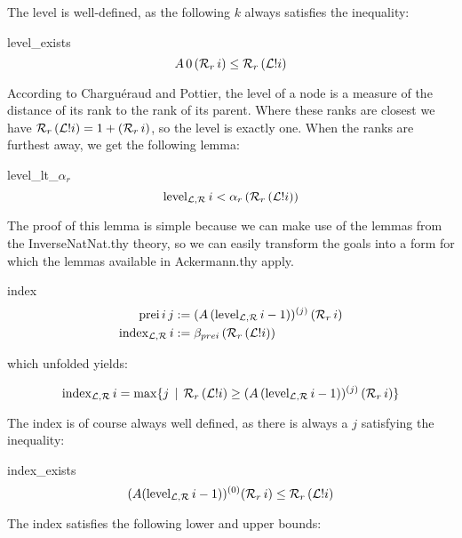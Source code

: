 \documentclass[headsepline,footsepline,footinclude=false,oneside,fontsize=11pt,paper=a4,listof=totoc,bibliography=totoc]{scrbook} %
\begin{document}
The level is well-defined, as the following $k$ always satisfies the inequality:

\begin{lemma}{level\_exists}
	\begin{equation}
	A\, 0\, (\mathcal{R}_r\, i) \leq \mathcal{R}_r\, (\mathcal{L}!i)
	\end{equation}
\end{lemma}

According to Charguéraud and Pottier, the level of a node is a measure of the distance of its rank to the rank of its parent. Where these ranks are closest we have $\mathcal{R}_r\, (\mathcal{L}!i) = 1 + (\mathcal{R}_r\, i)$, so the level is exactly one. When the ranks are furthest away, we get the following lemma:

\begin{lemma}{level\_lt\_$\alpha_r$} 
	\begin{equation}
		\mathrm{level}_{\mathcal{L},\mathcal{R}}\, i < \alpha_r\, (\mathcal{R}_r\, (\mathcal{L}!i)) \label{levelalpha}
	\end{equation}
\end{lemma}

The proof of this lemma is simple because we can make use of the lemmas from the InverseNatNat.thy theory, so we can easily transform the goals into a form for which the lemmas available in Ackermann.thy apply.

\begin{definition}{index}
	\begin{align}
	\mathrm{prei}\, i \, j &:= (A\, (\mathrm{level}_{\mathcal{L},\mathcal{R}}\, i - 1))^{(j)} \, (\mathcal{R}_r\, i)\\
	\mathrm{index}_{\mathcal{L},\mathcal{R}}\, i &:= \beta_{prei}\, (\mathcal{R}_r\, (\mathcal{L}!i))
	\end{align}
	
	which unfolded yields:
	
	\begin{equation}
	\mathrm{index}_{\mathcal{L},\mathcal{R}}\, i = \max\{j \,\mid\, \mathcal{R}_r\, (\mathcal{L}!i) \geq (A\, (\mathrm{level}_{\mathcal{L},\mathcal{R}}\, i - 1))^{(j)}\, (\mathcal{R}_r\, i)\}
	\end{equation}
\end{definition}

The index is of course always well defined, as there is always a $j$ satisfying the inequality:

\begin{lemma}{index\_exists}
	\begin{equation}
	(A (\mathrm{level}_{\mathcal{L},\mathcal{R}}\, i - 1))^{(0)} (\mathcal{R}_r\, i) \leq \mathcal{R}_r\, (\mathcal{L}!i)
	\end{equation}
\end{lemma}

The index satisfies the following lower and upper bounds:
\end{document}
